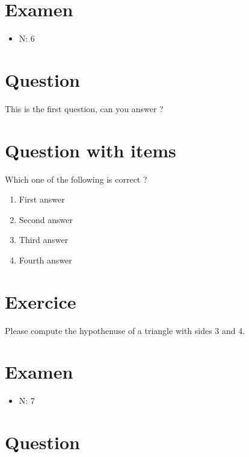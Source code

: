 \documentclass[a4paper,11pt,twoside]{article}
\begin{document}
\section*{Examen}
\label{sec:org49eda09}
\begin{itemize}
\item N: 6
\end{itemize}
\section*{Question}
\label{sec:org76555a1}

This is the first question, can you answer ?



\section*{Question with items}
\label{sec:orge14af68}

Which one of the following is correct ?

\begin{enumerate}
\item First answer
\item Second answer
\item Third answer
\item Fourth answer
\end{enumerate}



\section*{Exercice}
\label{sec:org9dcaeb4}

Please compute the hypothenuse of a triangle with sides 3 and 4.



\subsection*{}
\label{sec:orgfa78ee8}

\cleardoublepage

\section*{Examen}
\label{sec:org89e0c7d}
\begin{itemize}
\item N: 7
\end{itemize}
\section*{Question}
\label{sec:orgdb8e886}
\end{document}
